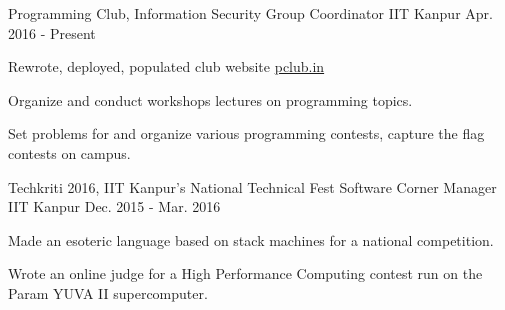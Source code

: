 


\begin{cventries}

  \cventry
  {Programming Club, Information Security Group}
  {Coordinator}
  {IIT Kanpur}
  {Apr. 2016 - Present}
  {
    \begin{cvitems}
    \item Rewrote, deployed, populated club website \href{http://pclub.in}{pclub.in}
    \item Organize and conduct workshops lectures on programming topics.
    \item Set problems for and organize various programming contests,
      capture the flag contests on campus.
    \end{cvitems}
  }

  \cventry
  {Techkriti 2016, IIT Kanpur's National Technical Fest}
  {Software Corner Manager}
  {IIT Kanpur}
  {Dec. 2015 - Mar. 2016}
  {
    \begin{cvitems}
    \item Made an esoteric language based on stack machines for a
      national competition.
    \item Wrote an online judge for a High Performance Computing
      contest run on the Param YUVA II supercomputer.
    \end{cvitems}
  }

\end{cventries}

